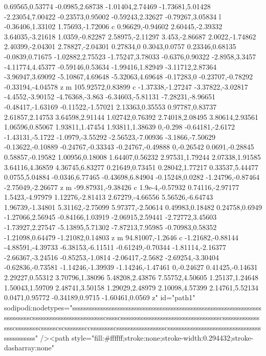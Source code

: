 0.69565,0.53774 -0.0985,2.68738 -1.01404,2.74469 -1.73681,5.01428 -2.23054,7.00422 -0.23573,0.95002 -0.59243,2.32627 -0.79267,3.05834 l -0.36406,1.33102 1.75693,-1.72006 c 0.96629,-0.94602 2.60445,-2.39332 3.64035,-3.21618 1.0359,-0.82287 2.58975,-2.11297 3.453,-2.86687 2.0022,-1.74862 2.40399,-2.04301 2.78827,-2.04301 0.27834,0 0.3043,0.0757 0.23346,0.68135 -0.0839,0.71675 -1.02882,2.75523 -1.75247,3.78033 -0.6376,0.90322 -2.8958,3.3457 -4.11774,4.45377 -0.59146,0.53634 -1.99416,1.82949 -3.11712,2.87364 -3.96947,3.69092 -5.10867,4.69648 -5.32063,4.69648 -0.17283,0 -0.23707,-0.78292 -0.33194,-4.04578 z m 105.92572,0.83899 c -1.37338,-1.27247 -3.37822,-3.02817 -4.4552,-3.90152 -4.76368,-3.863 -6.34603,-5.81131 -7.28231,-8.96651 -0.48417,-1.63169 -0.11522,-1.57021 2.13363,0.35553 0.97787,0.83737 2.61857,2.14753 3.64598,2.91144 1.02742,0.76392 2.74018,2.08495 3.80614,2.93561 1.06596,0.85067 1.93811,1.47454 1.93811,1.38639 0,-0.298 -0.64181,-2.6172 -1.43131,-5.1722 -1.0979,-3.55292 -2.56523,-7.00936 -3.1866,-7.50629 -0.13622,-0.10889 -0.24767,-0.33343 -0.24767,-0.49888 0,-0.26542 0.0691,-0.28845 0.58857,-0.19582 1.00956,0.18008 1.64407,0.56232 2.97531,1.79244 2.07338,1.91585 3.64116,4.36859 4.36745,6.83277 0.21649,0.73451 0.28042,1.77217 0.33537,5.44477 0.0755,5.04884 -0.0346,6.77465 -0.43698,6.84904 -0.15248,0.0282 -1.24796,-0.87464 -2.75049,-2.26677 z m -99.87931,-9.38426 c 1.9e-4,-0.57932 0.74116,-2.97177 1.5423,-4.97979 1.12276,-2.81413 2.67279,-4.66556 5.56526,-6.64743 1.96739,-1.34801 5.31162,-2.75099 5.97377,-2.50614 0.49983,0.18482 0.24758,0.6949 -1.27066,2.56945 -0.84166,1.03919 -2.06915,2.59441 -2.72772,3.45603 -1.73927,2.27547 -5.13895,5.71302 -7.87213,7.95985 -0.70983,0.58352 -1.21098,0.64479 -1.21082,0.14803 z m 94.81007,-1.2646 c -1.21682,-0.88144 -4.88591,-4.39733 -6.38153,-6.11511 -0.61249,-0.70344 -1.81114,-2.16377 -2.66367,-3.24516 -0.85253,-1.0814 -2.06417,-2.5682 -2.69254,-3.30404 -0.62836,-0.73581 -1.14246,-1.39939 -1.14246,-1.47461 0,-0.24627 0.41425,-0.14631 2.29227,0.55312 3.70796,1.38096 5.48208,2.43876 7.55752,4.50605 1.25137,1.24648 1.50043,1.59709 2.48741,3.50158 1.29029,2.48979 2.10098,4.57399 2.14761,5.52134 0.0471,0.95772 -0.34189,0.9715 -1.60461,0.0569 z"
                id="path1"
                sodipodi:nodetypes="sssssssssssssssssssssssssssssssssssssssssssssssssssssssssssssssssssssssssssscssssssssssssssssssssssssscsssscssssssssssssssssssssssssssssssssssscsssssssssssssssscsssssssscssssscscsssssssccsssssssscssssssssssssssssscssssssssssssssssssssssssssssssssssssssssssss" /><path
                style="fill:#ffffff;stroke:none;stroke-width:0.294432;stroke-dasharray:none"

